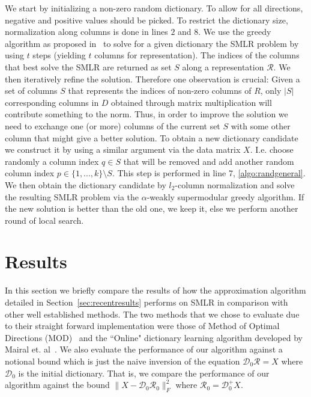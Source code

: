 \documentclass{article}
\newcommand{\Rr}{\mathcal{R}}
\newcommand{\D}{\mathcal{D}}
\begin{document}
\noindent We start by initializing a non-zero random dictionary. To allow for all directions, negative and positive values should be picked. To restrict the dictionary size, normalization along columns is done in lines $2$ and $8$. We use the greedy algorithm as proposed in~\cite{weaklyalpha} to solve for a given dictionary the SMLR problem by using $t$ steps (yielding $t$ columns for representation). The indices of the columns that best solve the SMLR are returned as set $S$ along a representation $\Rr$. We then iteratively refine the solution. Therefore one observation is crucial: Given a set of columns $S$ that represents the indices of non-zero columns of $R$, only $|S|$ corresponding columns in $D$ obtained through matrix multiplication will contribute something to the norm. Thus, in order to improve the solution we need to exchange one (or more) columns of the current set $S$ with some other column that might give a better solution. To obtain a new dictionary candidate we construct it by using a similar argument via the data matrix $X$. I.e. choose randomly a column index $q \in S$ that will be removed and add another random column index $p \in \lbrace 1, ..., k \rbrace \setminus S$. This step is performed in line 7, \ref{algo:randgeneral}. We then obtain the dictionary candidate by $l_2$-column normalization and solve the resulting SMLR problem via the $\alpha$-weakly supermodular greedy algorithm. If the new solution is better than the old one, we keep it, else we perform another round of local search.

\section{Results}\label{sec:results}

In this section we briefly compare the results of how the approximation algorithm detailed in Section~\ref{sec:recentresults} performs on SMLR in comparison with other well established methods. The two methods that we chose to evaluate due to their straight forward implementation were those of Method of Optimal Directions (MOD)~\cite{MOD} and the ``Online" dictionary learning algorithm developed by Mairal et. al~\cite{mairal09}. We also evaluate the performance of our algorithm against a notional bound which is just the naive inversion of the equation $\D_0\Rr = X$ where $\D_0$ is the initial dictionary. That is, we compare the performance of our algorithm against the bound $\|X-\D_0\Rr_0\|_F^2$ where $\Rr_0 = \D_0^+ X$.
\end{document}
